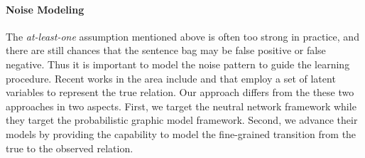 \paragraph{Noise Modeling}
The \emph{at-least-one} assumption mentioned above is often too strong in practice, and there are still chances that the
sentence bag may be false positive or false negative. Thus it is important to model the noise pattern to guide the learning procedure.
Recent works in the area include \cite{ritter2013modeling} and \cite{min2013distant} that
employ a set of latent variables to represent the true relation. Our approach differs
from the these two approaches in two aspects. 
First, we target the neutral network framework while they target the probabilistic graphic model framework. 
Second, we advance their models by providing the capability to model the fine-grained transition from the true to the observed relation.





